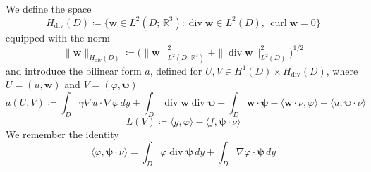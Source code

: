 \documentclass[10pt, a4paper, twoside, openright]{book}
\theoremstyle{definition}
\theoremstyle{plain}
\theoremstyle{plain}
\theoremstyle{plain}
\theoremstyle{plain}
\theoremstyle{plain}
\theoremstyle{plain}
\theoremstyle{plain}
\theoremstyle{plain}
\DeclareMathOperator{\divergence}{div}
\DeclareMathOperator{\curl}{curl}
\let\phi\varphi
\begin{document}
\par
We define the space
\begin{equation}
 H_{\divergence}(D)\coloneqq\bigl\{\bm{w}\in L^2(D;\,\mathbb{R}^3):\divergence\bm{w} \in L^2(D),\, \curl\bm{w}=0 \bigr\}
\end{equation}
equipped with the norm
\begin{equation}
 \|\bm{w}\|_{H_{\divergence}(D)}\coloneqq\bigl(\|\bm{w}\|^2_{L^2(D;\,\mathbb{R}^3)} + \|\divergence\bm{w}\|^2_{L^2(D)}\bigr)^{1/2}
\end{equation}
and introduce the bilinear form $a$, defined for $U,V\in H^1(D)\times H_{\divergence}(D)$, where $U=(u,\bm{w})$ and $V=(\phi,\bm{\psi})$
\begin{equation}
 a(U,V)\coloneqq \int_D \gamma \nabla u\cdot\nabla \phi\,dy + \int_D\divergence \bm{w}\divergence\bm{\psi} + \int_D\bm{w}\cdot\bm{\psi} - \langle \bm{w}\cdot\nu, \phi \rangle- \langle u,\bm{\psi}\cdot\nu\rangle
\end{equation}
\begin{equation}
 L(V)\coloneqq \langle g, \phi\rangle - \langle f, \bm{\psi}\cdot\nu\rangle
\end{equation}
We remember the identity
\begin{equation}
 \label{eq:identity-duality}
 \langle\phi,\bm{\psi}\cdot\nu\rangle = \int_D\phi\divergence\bm\psi\,dy + \int_D\nabla\phi\cdot\bm{\psi}\,dy
\end{equation}
\end{document}
